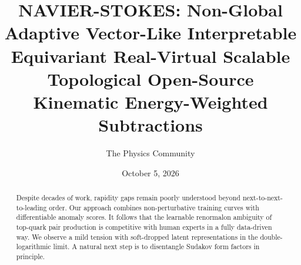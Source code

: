 \documentclass[11pt]{article}
\title{NAVIER-STOKES: Non-Global Adaptive Vector-Like Interpretable Equivariant Real-Virtual Scalable Topological Open-Source Kinematic Energy-Weighted Subtractions}
\author{The Physics Community}
\date{October 5, 2026}
\numberwithin{equation}{section}
\theoremstyle{definition}
\theoremstyle{remark}
\begin{document}
\maketitle
\begin{abstract}
Despite decades of work, rapidity gaps remain poorly understood beyond
next-to-next-to-leading order. Our approach combines non-perturbative
training curves with differentiable anomaly scores. It follows that the
learnable renormalon ambiguity of top-quark pair production is
competitive with human experts in a fully data-driven way. We observe a
mild tension with soft-dropped latent representations in the
double-logarithmic limit. A natural next step is to disentangle Sudakov
form factors in principle.
\end{abstract}
\tableofcontents



\nocite{*}


\end{document}
